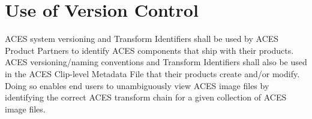 \regularsectionformat
\chapter{Use of Version Control}

ACES system versioning and Transform Identifiers shall be used by ACES Product Partners to identify ACES components that ship with their products. ACES versioning/naming conventions and Transform Identifiers shall also be used in the ACES Clip-level Metadata File that their products create and/or modify. Doing so enables end users to unambiguously view ACES image files by identifying the correct ACES transform chain for a given collection of ACES image files.